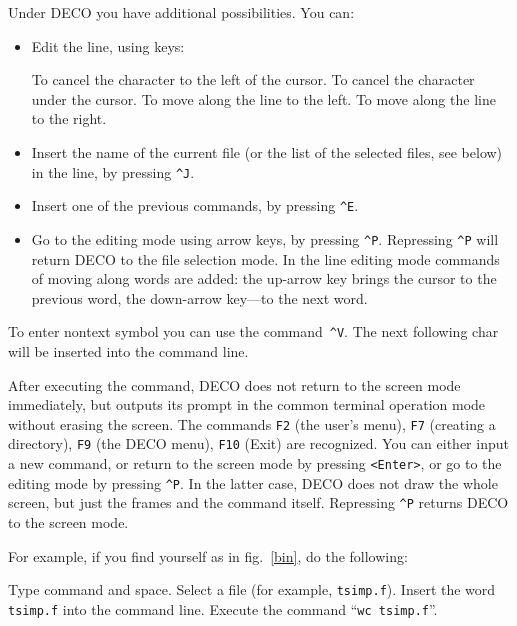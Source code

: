 Under DECO you have additional possibilities. You can:
\begin{itemize}
\item
Edit the line, using keys:

\begin{example}
To cancel the character to the left of the cursor.
To cancel the character under the cursor.
To move along the line to the left.
To move along the line to the right.
\end{example}

\item
Insert the name of the current file (or the list of
the selected files, see below) in the line, by pressing {\tt \^{}J}.
\item
Insert one of the previous commands, by pressing {\tt \^{}E}.
\item
Go to the editing mode using arrow keys, by pressing {\tt \^{}P}.
Repressing {\tt \^{}P} will return DECO to the file selection mode.
In the line editing mode commands of moving along words are added:
the up-arrow key brings the cursor to the previous word, the down-arrow
key---to the next word.
\end{itemize}

To enter nontext symbol you can use the command~{\tt \^{}V}.  The next
following char will be inserted into the command line.

After executing the command, DECO does not return to
the screen mode immediately, but outputs its prompt in 
the common terminal operation mode without erasing 
the screen. The commands {\tt F2} (the user's menu), {\tt F7}
(creating a directory), {\tt F9} (the DECO menu), {\tt F10} (Exit)
are recognized. You can either input a new command, 
or return to the screen mode by pressing {\tt <Enter>}, or go
to the editing mode by pressing {\tt \^{}P}. In the latter case,
DECO does not draw the whole screen, but just the frames and the command
itself. Repressing {\tt \^{}P} returns DECO to the screen mode.

For example, if you find yourself as in fig.~\ref{bin}, do the following:
\begin{example}
Type command and space.
\litem{$\uparrow$ $\downarrow$ $\leftarrow$ $\rightarrow$}
Select a file (for example, {\tt tsimp.f}).
Insert the word {\tt tsimp.f} into the command line.
Execute the command ``{\tt wc tsimp.f}''.
\end{example}

